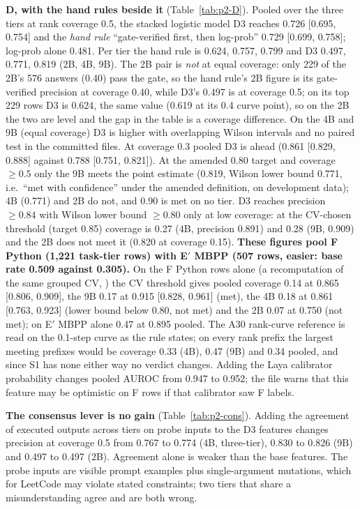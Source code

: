 \documentclass[11pt,a4paper]{article}
\newcommand{\code}[1]{\texttt{\detokenize{#1}}}
\begin{document}
\textbf{D, with the hand rules beside it} (Table~\ref{tab:p2-D}). Pooled over the three tiers at rank coverage 0.5, the stacked logistic model D3 \code{lr|core} reaches 0.726 [0.695, 0.754] and the \emph{hand rule} ``gate-verified first, then log-prob'' 0.729 [0.699, 0.758]; log-prob alone 0.481. Per tier the hand rule is 0.624, 0.757, 0.799 and D3 0.497, 0.771, 0.819 (2B, 4B, 9B). The 2B pair is \emph{not} at equal coverage: only 229 of the 2B's 576 answers (0.40) pass the gate, so the hand rule's 2B figure is its gate-verified precision at coverage 0.40, while D3's 0.497 is at coverage 0.5; on its top 229 rows D3 is 0.624, the same value (0.619 at its 0.4 curve point), so on the 2B the two are level and the gap in the table is a coverage difference. On the 4B and 9B (equal coverage) D3 is higher with overlapping Wilson intervals and no paired test in the committed files. At coverage 0.3 pooled D3 is ahead (0.861 [0.829, 0.888] against 0.788 [0.751, 0.821]). At the amended 0.80 target and coverage $\ge0.5$ only the 9B meets the point estimate (0.819, Wilson lower bound 0.771, i.e.\ ``met with confidence'' under the amended definition, on development data); 4B (0.771) and 2B do not, and 0.90 is met on no tier. D3 reaches precision $\ge0.84$ with Wilson lower bound $\ge0.80$ only at low coverage: at the CV-chosen threshold (target 0.85) coverage is 0.27 (4B, precision 0.891) and 0.28 (9B, 0.909) and the 2B does not meet it (0.820 at coverage 0.15). \textbf{These figures pool F Python (1,221 task-tier rows) with E$'$ MBPP (507 rows, easier: base rate 0.509 against 0.305).} On the F Python rows alone (a recomputation of the same grouped CV, \code{audit3120_recomputed.json}) the CV threshold gives pooled coverage 0.14 at 0.865 [0.806, 0.909], the 9B 0.17 at 0.915 [0.828, 0.961] (met), the 4B 0.18 at 0.861 [0.763, 0.923] (lower bound below 0.80, not met) and the 2B 0.07 at 0.750 (not met); on E$'$ MBPP alone 0.47 at 0.895 pooled. The A30 rank-curve reference is read on the 0.1-step curve as the rule states; on every rank prefix the largest meeting prefixes would be coverage 0.33 (4B), 0.47 (9B) and 0.34 pooled, and since S1 has none either way no verdict changes. Adding the Laya calibrator probability changes pooled AUROC from 0.947 to 0.952; the file warns that this feature may be optimistic on F rows if that calibrator saw F labels.

\textbf{The consensus lever is no gain} (Table~\ref{tab:p2-cons}). Adding the agreement of executed outputs across tiers on probe inputs to the D3 features changes precision at coverage 0.5 from 0.767 to 0.774 (4B, three-tier), 0.830 to 0.826 (9B) and 0.497 to 0.497 (2B). Agreement alone is weaker than the base features. The probe inputs are visible prompt examples plus single-argument mutations, which for LeetCode may violate stated constraints; two tiers that share a misunderstanding agree and are both wrong.
\end{document}
